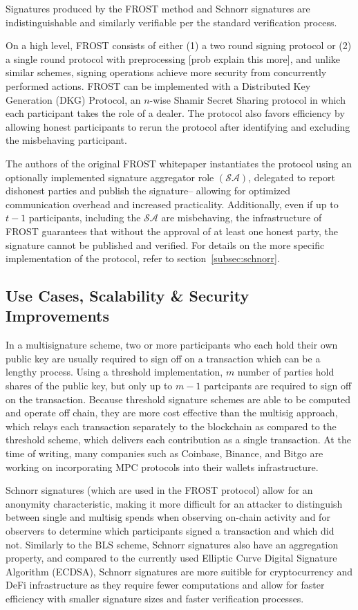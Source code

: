 \documentclass[12pt]{article}
\begin{document}
Signatures produced by the FROST method and Schnorr signatures are indistinguishable and similarly verifiable per the standard verification process.  

On a high level, FROST consists of either (1) a two round signing protocol or (2) a single round protocol with preprocessing [prob explain this more], and unlike similar schemes, signing operations achieve more security from concurrently performed actions. FROST can be implemented with a Distributed Key Generation (DKG) Protocol, an \(n\)-wise Shamir Secret Sharing protocol in which each participant takes the role of a dealer. The protocol also favors efficiency by allowing honest participants to rerun the protocol after identifying and excluding the misbehaving participant. 

The authors of the original FROST whitepaper instantiates the protocol using an optionally implemented signature aggregator role \( (\mathcal{SA})\), delegated to report dishonest parties and publish the signature-- allowing for optimized communication overhead and increased practicality. Additionally, even if up to \(t-1\) participants, including the \( \mathcal{SA}\) are misbehaving, the infrastructure of FROST guarantees that without the approval of at least one honest party, the signature cannot be published and verified. For details on the more specific implementation of the protocol, refer to section~\ref{subsec:schnorr}.

\subsection{Use Cases, Scalability \& Security Improvements}

In a multisignature scheme, two or more participants who each hold their own public key are usually required to sign off on a transaction which can be a lengthy process. Using a threshold implementation, \(m\) number of parties hold shares of the public key, but only up to \(m-1\) partcipants are required to sign off on the transaction. Because threshold signature schemes are able to be computed and operate off chain, they are more cost effective than the multisig approach, which relays each transaction separately to the blockchain as compared to the threshold scheme, which delivers each contribution as a single transaction. At the time of writing, many companies such as Coinbase, Binance, and Bitgo are working on incorporating MPC protocols into their wallets infrastructure. 

Schnorr signatures (which are used in the FROST protocol) allow for an anonymity characteristic, making it more difficult for an attacker to distinguish between single and multisig spends when observing on-chain activity and for observers to determine which participants signed a transaction and which did not. Similarly to the BLS scheme, Schnorr signatures also have an aggregation property, and compared to the currently used Elliptic Curve Digital Signature Algorithm (ECDSA), Schnorr signatures are more suitible for cryptocurrency and DeFi infrastructure as they require fewer computations and allow for faster efficiency with smaller signature sizes and faster verification processes.  
\end{document}
